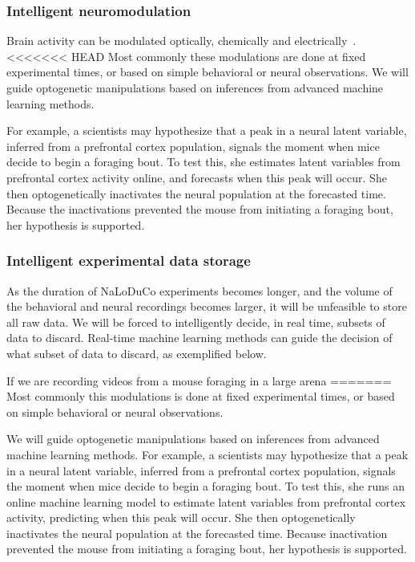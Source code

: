 \documentclass[12pt]{article}
\begin{document}
\subsubsection*{Intelligent neuromodulation}

Brain activity can be modulated optically, chemically and
electrically~\citep{}.
%
<<<<<<< HEAD
Most commonly these modulations are done at fixed experimental times, or based on
simple behavioral or neural observations.
%
We will guide optogenetic manipulations based on inferences from advanced
machine learning methods.

For example, a scientists may hypothesize that a peak in a neural latent
variable, inferred from a prefrontal cortex population, signals the moment when
mice decide to begin a foraging bout.  To test this, she estimates latent
variables from prefrontal cortex activity online, and forecasts when this peak
will occur. She then optogenetically inactivates the neural population at the
forecasted time.  Because the inactivations prevented the mouse from initiating
a foraging bout, her hypothesis is supported.

\subsubsection*{Intelligent experimental data storage}

As the duration of NaLoDuCo experiments becomes longer, and the volume of the
behavioral and neural recordings becomes larger, it will be unfeasible to
store all raw data. We will be forced to intelligently decide, in real time,
subsets of data to discard. Real-time machine learning methods can guide the
decision of what subset of data to discard, as exemplified below.

If we are recording videos from a mouse foraging in a large arena
=======
Most commonly this modulations is done at fixed experimental times, or based on
simple behavioral or neural observations.

We will guide optogenetic manipulations based on inferences from advanced
machine learning methods.
%
For example, a scientists may hypothesize that a peak in a neural latent
variable, inferred from a prefrontal cortex population, signals the moment when
mice decide to begin a foraging bout.  To test this, she runs an online machine
learning model to estimate latent variables from prefrontal cortex activity,
predicting when this peak will occur. She then optogenetically inactivates the
neural population at the forecasted time.  Because inactivation prevented the
mouse from initiating a foraging bout, her hypothesis is supported.
\end{document}
